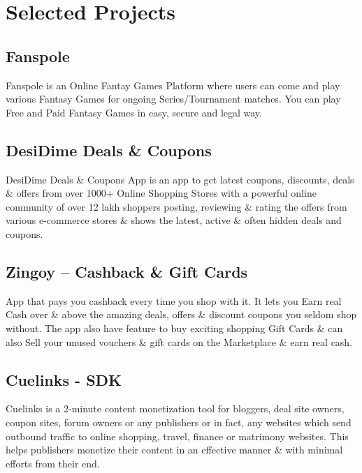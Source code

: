\documentclass[]{deedy-resume-openfont}
\begin{document}
\begin{minipage}[t]{0.66\textwidth}

\section{Selected Projects}
\subsection{Fanspole}
Fanspole is an Online Fantay Games Platform where users can come and play various Fantasy Games for ongoing Series/Tournament matches. You can play Free and Paid Fantasy Games in easy, secure and legal way.
\sectionsep

\subsection{DesiDime Deals \& Coupons}
DesiDime Deals \& Coupons App is an app to get latest coupons, discounts, deals \& offers from over 1000+ Online Shopping Stores with a powerful online community of over 12 lakh shoppers posting, reviewing \& rating the offers from various e-commerce stores \& shows the latest, active \& often hidden deals and coupons.

\sectionsep

\subsection{Zingoy – Cashback \& Gift Cards}
App that pays you cashback every time you shop with it. It lets you Earn real Cash over \& above the amazing deals, offers \& discount coupons you seldom shop without. The app also have feature to buy exciting shopping Gift Cards \& can also Sell your unused vouchers \& gift cards on the Marketplace \& earn real cash.
\sectionsep

\subsection{Cuelinks - SDK}
Cuelinks is a 2-minute content monetization tool for bloggers, deal site owners, coupon sites, forum owners or any publishers or in fact, any websites which send outbound traffic to online shopping, travel, finance or matrimony websites. This helps publishers monetize their content in an effective manner \& with minimal efforts from their end.
\sectionsep


\end{minipage}
\end{document}
